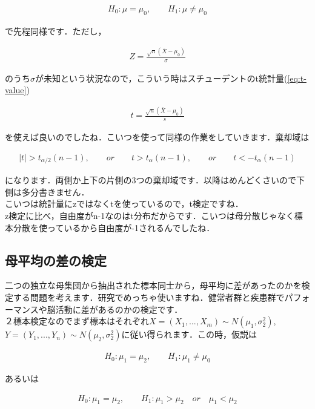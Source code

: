 \documentclass[11pt,a4paper,uplatex]{ujreport} 	%
\begin{document}
\begin{align}
  H_0 : \mu = \mu_0, \qquad H_1 : \mu \neq \mu_0
\end{align}

で先程同様です．ただし，

\begin{align}
  Z = \frac{\sqrt{n}(\bar{X}-\mu_0)}{\sigma}
\end{align}

のうち$\sigma$が未知という状況なので，こういう時はスチューデントのt統計量(\ref{eq:t-value})

\begin{align}
  t = \frac{\sqrt{n}(\bar{X}-\mu_0)}{s}
\end{align}

を使えば良いのでしたね．こいつを使って同様の作業をしていきます．棄却域は

\begin{align}
  |t| > t_{\alpha/2}(n-1), \qquad or \qquad t>t_\alpha(n-1), \qquad or \qquad t<-t_\alpha(n-1)
\end{align}

になります．両側か上下の片側の3つの棄却域です．以降はめんどくさいので下側は多分書きません．\\

こいつは統計量にzではなくtを使っているので，t検定ですね．\\

z検定に比べ，自由度がn-1なのはt分布だからです．こいつは母分散じゃなく標本分散を使っているから自由度が-1されるんでしたね．

\subsection{母平均の差の検定}
二つの独立な母集団から抽出された標本同士から，母平均に差があったのかを検定する問題を考えます．研究でめっちゃ使いますね．健常者群と疾患群でパフォーマンスや脳活動に差があるのかの検定です．\\

２標本検定なのでまず標本はそれぞれ$X=(X_1,...,X_m) \sim N(\mu_1, \sigma_2^2)$, $Y=(Y_1,...,Y_n) \sim N(\mu_2, \sigma_2^2)$に従い得られます．この時，仮説は

\begin{align}
  H_0 : \mu_1 = \mu_2, \qquad H_1 : \mu_1 \neq \mu_0
\end{align}

あるいは

\begin{align}
  H_0 : \mu_1 = \mu_2, \qquad H_1 : \mu_1 > \mu_2 \quad or\quad \mu_1 < \mu_2
\end{align}
\end{document}
